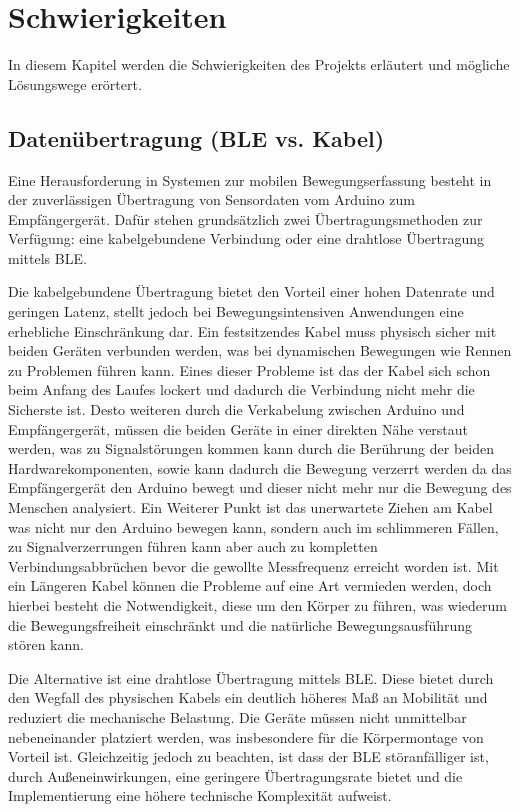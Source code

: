 \chapter{Schwierigkeiten} \label{schwierigkeiten}
In diesem Kapitel werden die Schwierigkeiten des Projekts erläutert und mögliche Lösungswege erörtert.

\section{Datenübertragung (BLE vs. Kabel)}
\label{sec:datenübertragung}
Eine Herausforderung in Systemen zur mobilen Bewegungserfassung besteht in der zuverlässigen Übertragung von Sensordaten vom Arduino zum Empfängergerät. Dafür stehen grundsätzlich zwei Übertragungsmethoden zur Verfügung: eine kabelgebundene Verbindung oder eine drahtlose Übertragung mittels BLE.

Die kabelgebundene Übertragung bietet den Vorteil einer hohen Datenrate und geringen Latenz, stellt jedoch bei Bewegungsintensiven Anwendungen eine erhebliche Einschränkung dar. Ein festsitzendes Kabel muss physisch sicher mit beiden Geräten verbunden werden, was bei dynamischen Bewegungen wie Rennen zu Problemen führen kann. Eines dieser Probleme ist das der Kabel sich schon beim Anfang des Laufes lockert und dadurch die Verbindung nicht mehr die Sicherste ist. Desto weiteren durch die Verkabelung zwischen Arduino und Empfängergerät, müssen die beiden Geräte in einer direkten Nähe verstaut werden, was zu Signalstörungen kommen kann durch die Berührung der beiden Hardwarekomponenten, sowie kann dadurch die Bewegung verzerrt werden da das Empfängergerät den Arduino bewegt und dieser nicht mehr nur die Bewegung des Menschen analysiert. Ein Weiterer Punkt ist das unerwartete Ziehen am Kabel was nicht nur den Arduino bewegen kann, sondern auch im schlimmeren Fällen, zu Signalverzerrungen führen kann aber auch zu kompletten Verbindungsabbrüchen bevor die gewollte Messfrequenz erreicht worden ist. Mit ein Längeren Kabel können die Probleme auf eine Art vermieden werden, doch hierbei besteht die Notwendigkeit, diese um den Körper zu führen, was wiederum die Bewegungsfreiheit einschränkt und die natürliche Bewegungsausführung stören kann. 

Die Alternative ist eine drahtlose Übertragung mittels BLE. Diese bietet durch den Wegfall des physischen Kabels ein deutlich höheres Maß an Mobilität und reduziert die mechanische Belastung. Die Geräte müssen nicht unmittelbar nebeneinander platziert werden, was insbesondere für die Körpermontage von Vorteil ist. Gleichzeitig jedoch zu beachten, ist dass der BLE störanfälliger ist, durch Außeneinwirkungen, eine geringere Übertragungsrate bietet und die Implementierung eine höhere technische Komplexität aufweist.

